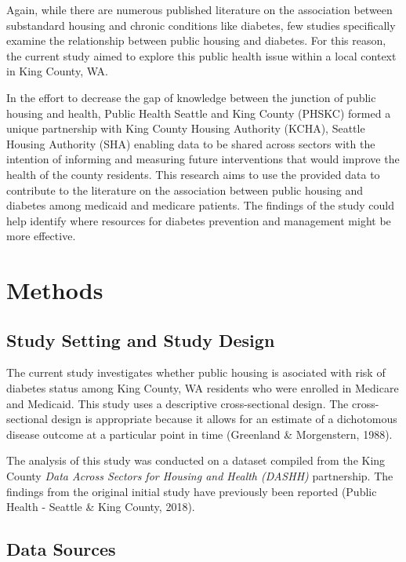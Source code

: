 \documentclass [11pt, proquest] {uwthesis}[2015/03/03]
\begin{document}
Again, while there are numerous published literature on the association
between substandard housing and chronic conditions like diabetes, few
studies specifically examine the relationship between public housing and
diabetes. For this reason, the current study aimed to explore this
public health issue within a local context in King County, WA.

In the effort to decrease the gap of knowledge between the junction of
public housing and health, Public Health Seattle and King County (PHSKC)
formed a unique partnership with King County Housing Authority (KCHA),
Seattle Housing Authority (SHA) enabling data to be shared across
sectors with the intention of informing and measuring future
interventions that would improve the health of the county residents.
This research aims to use the provided data to contribute to the
literature on the association between public housing and diabetes among
medicaid and medicare patients. The findings of the study could help
identify where resources for diabetes prevention and management might be
more effective.

\chapter{Methods}\label{methods}

\section{Study Setting and Study
Design}\label{study-setting-and-study-design}

The current study investigates whether public housing is asociated with
risk of diabetes status among King County, WA residents who were
enrolled in Medicare and Medicaid. This study uses a descriptive
cross-sectional design. The cross-sectional design is appropriate
because it allows for an estimate of a dichotomous disease outcome at a
particular point in time (Greenland \& Morgenstern, 1988).

The analysis of this study was conducted on a dataset compiled from the
King County \emph{Data Across Sectors for Housing and Health (DASHH)}
partnership. The findings from the original initial study have
previously been reported (Public Health - Seattle \& King County, 2018).

\section{Data Sources}\label{data-sources}
\end{document}
